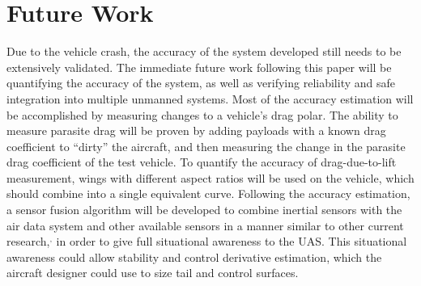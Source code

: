 \chapter{Future Work}
 Due to the vehicle crash, the accuracy of the system developed still needs to be extensively validated. The immediate future work following this paper will be quantifying the accuracy of the system, as well as verifying reliability and safe integration into multiple unmanned systems. Most of the accuracy estimation will be accomplished by measuring changes to a vehicle's drag polar. The ability to measure parasite drag will be proven by adding payloads with a known drag coefficient to ``dirty'' the aircraft, and then measuring the change in the parasite drag coefficient of the test vehicle. To quantify the accuracy of drag-due-to-lift measurement, wings with different aspect ratios will be used on the vehicle, which should combine into a single equivalent curve\cite{prandtl1923applications}. Following the accuracy estimation, a sensor fusion algorithm will be developed to combine inertial sensors with the air data system and other available sensors in a manner similar to other current research,\cite{wvINSAirData}$^,$\cite{gtUKF} in order to give full situational awareness to the UAS. This situational awareness could allow stability and control derivative estimation, which the aircraft designer could use to size tail and control surfaces.